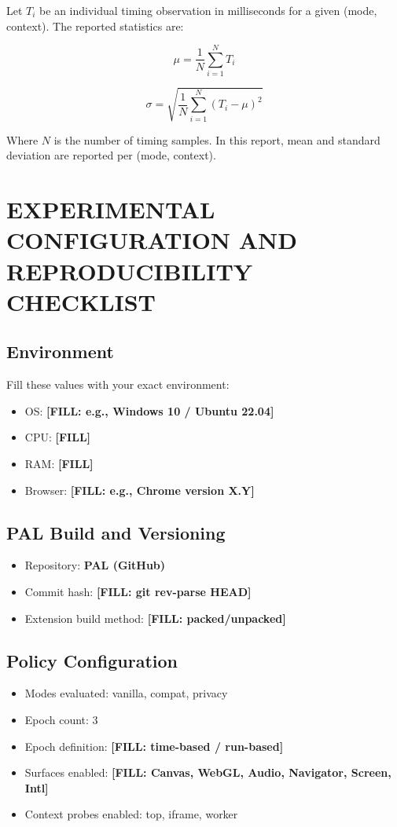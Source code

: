 \documentclass[11pt]{report}
\begin{document}
Let $T_{i}$ be an individual timing observation in milliseconds for a given (mode, context). The reported statistics are:

\[
\mu = \frac{1}{N}\sum_{i=1}^{N} T_i
\]

\[
\sigma = \sqrt{\frac{1}{N}\sum_{i=1}^{N} (T_i - \mu)^2}
\]

Where $N$ is the number of timing samples. In this report, mean and standard deviation are reported per (mode, context).

\chapter{EXPERIMENTAL CONFIGURATION AND REPRODUCIBILITY CHECKLIST}

\section{Environment}

Fill these values with your exact environment:

\begin{itemize}
    \item OS: \textbf{[FILL: e.g., Windows 10 / Ubuntu 22.04]}
    \item CPU: \textbf{[FILL]}
    \item RAM: \textbf{[FILL]}
    \item Browser: \textbf{[FILL: e.g., Chrome version X.Y]}
\end{itemize}

\section{PAL Build and Versioning}

\begin{itemize}
    \item Repository: \textbf{PAL (GitHub)}
    \item Commit hash: \textbf{[FILL: git rev-parse HEAD]}
    \item Extension build method: \textbf{[FILL: packed/unpacked]}
\end{itemize}

\section{Policy Configuration}

\begin{itemize}
    \item Modes evaluated: vanilla, compat, privacy
    \item Epoch count: 3
    \item Epoch definition: \textbf{[FILL: time-based / run-based]}
    \item Surfaces enabled: \textbf{[FILL: Canvas, WebGL, Audio, Navigator, Screen, Intl]}
    \item Context probes enabled: top, iframe, worker
\end{itemize}
\end{document}

